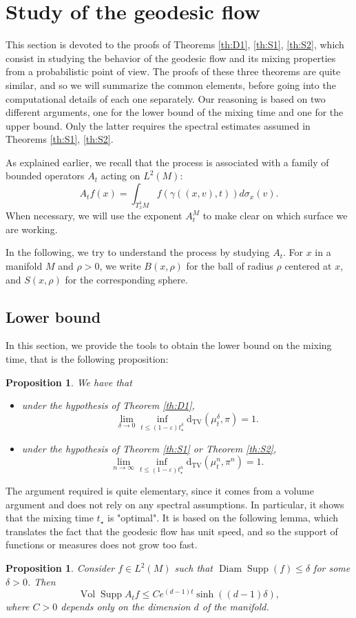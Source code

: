 \documentclass[]{scrartcl}
\newcommand{\DTV}{\mathrm{d_{TV}}}
\newcommand{\eps}{\varepsilon}
\DeclareMathOperator{\Supp}{Supp}
\DeclareMathOperator{\Vol}{Vol}
\DeclareMathOperator{\Diam}{Diam}
\newtheorem{proposition}[theorem]{Proposition}
\numberwithin{equation}{section}
\numberwithin{figure}{section}
\begin{document}
\section{Study of the geodesic flow} \label{GF}
This section is devoted to the proofs of Theorems \ref{th:D1}, \ref{th:S1}, \ref{th:S2}, which consist in studying the behavior of the geodesic flow and its mixing properties from a probabilistic point of view. 
The proofs of these three theorems are quite similar, and so we will summarize the common elements, before going into the computational details of each one separately. Our reasoning is based on two different arguments, one for the lower bound of the mixing time and one for the upper bound. Only the latter requires the spectral estimates assumed in Theorems \ref{th:S1}, \ref{th:S2}.

As explained earlier, we recall that the process is associated with a family of bounded operators $A_t$ acting on $L^2(M)$: \[A_tf(x) = \int_{T^1_xM} f(\gamma((x,v),t)) d\sigma_x(v).\] When necessary, we will use the exponent $A_t^M$ to make clear on which surface we are working.

In the following, we try to understand the process by studying $A_t$. For $x$ in a manifold $M$ and $\rho >0$, we write $B(x, \rho)$ for the ball of radius $\rho$ centered at $x$, and $S(x, \rho)$ for the corresponding sphere.

\subsection{Lower bound} In this section, we provide the tools to obtain the lower bound on the mixing time, that is the following proposition:
\begin{proposition}{}\label{prop:LB}
	We have that
	\begin{itemize}
		\item under the hypothesis of Theorem \ref{th:D1},
		\[\lim_{\delta \to 0}  \inf_{t \leq (1-\eps) t_\star^\delta} \DTV (\mu^\delta_t,\pi) = 1.\]
		\item under the hypothesis of Theorem \ref{th:S1} or Theorem \ref{th:S2},
		\[\lim_{n \to \infty}  \inf_{t \leq (1-\eps) t_\star^n} \DTV (\mu^n_t,\pi^n) = 1.\]
	\end{itemize}
\end{proposition}
The argument required is quite elementary, since it comes from a volume argument and does not rely on any spectral assumptions. In particular, it shows that the mixing time $t_\star$ is "optimal". It is based on the following lemma, which translates the fact that the geodesic flow has unit speed, and so the support of functions or measures does not grow too fast.
\begin{proposition}{}\label{prop:Croissancesupport}
	Consider $f \in L^2(M)$ such that $\Diam \Supp(f) \leq \delta$ for some $\delta > 0$. Then \[\Vol \Supp A_tf \leq Ce^{(d-1) t} \sinh\left((d-1)\delta\right),\]where $C>0$ depends only on the dimension $d$ of the manifold.	
\end{proposition}
\end{document}
